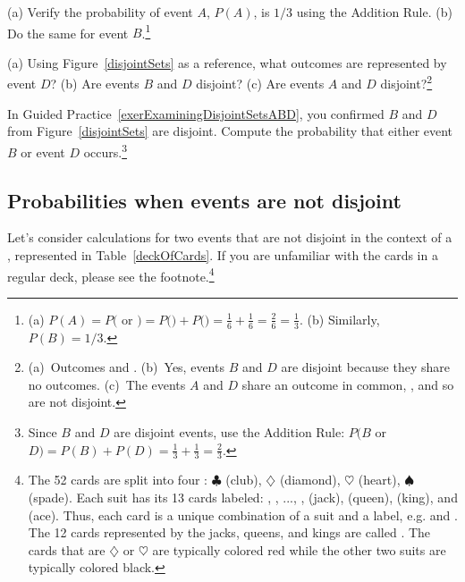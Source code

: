 \begin{exercise}
(a) Verify the probability of event $A$, $P(A)$, is $1/3$ using the Addition Rule. (b) Do the same for event $B$.\footnote{(a) $P(A) = P($ or $) = P($$) + P($$) = \frac{1}{6} + \frac{1}{6} = \frac{2}{6} = \frac{1}{3}$. (b) Similarly, $P(B) = 1/3$.}
\end{exercise}

\begin{exercise} \label{exerExaminingDisjointSetsABD}
(a) Using Figure~\ref{disjointSets} as a reference, what outcomes are represented by event $D$? (b) Are events $B$ and $D$ disjoint? (c) Are events $A$ and $D$ disjoint?\footnote{(a)~Outcomes  and . (b)~Yes, events $B$ and $D$ are disjoint because they share no outcomes. (c)~The events $A$ and $D$ share an outcome in common, , and so are not disjoint.}
\end{exercise}

\begin{exercise}
In Guided Practice~\ref{exerExaminingDisjointSetsABD}, you confirmed $B$ and $D$ from Figure~\ref{disjointSets} are disjoint. Compute the probability that either event $B$ or event $D$ occurs.\footnote{Since $B$ and $D$ are disjoint events, use the Addition Rule: $P(B$ or $D) = P(B) + P(D) = \frac{1}{3} + \frac{1}{3} = \frac{2}{3}$.}
\end{exercise}


\subsection{Probabilities when events are not disjoint}

Let's consider calculations for two events that are not disjoint in the context of a , represented in Table~\ref{deckOfCards}. If you are unfamiliar with the cards in a regular deck, please see the footnote.\footnote{The 52 cards are split into four : $\clubsuit$ (club), {\color{redcards}$\diamondsuit$} (diamond), {\color{redcards}$\heartsuit$} (heart), $\spadesuit$ (spade). Each suit has its 13 cards labeled: , , ..., ,  (jack),  (queen),  (king), and  (ace). Thus, each card is a unique combination of a suit and a label, e.g. {\color{redcards}} and . The 12 cards represented by the jacks, queens, and kings are called . The cards that are {\color{redcards}$\diamondsuit$} or {\color{redcards}$\heartsuit$} are typically colored {\color{redcards}red} while the other two suits are typically colored black.}

